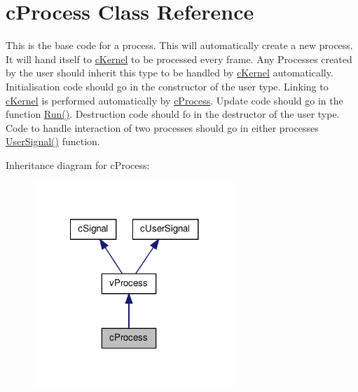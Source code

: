 \hypertarget{classc_process}{
\section{cProcess Class Reference}
\label{classc_process}
}


This is the base code for a process. This will automatically create a new process. It will hand itself to \hyperlink{classc_kernel}{cKernel} to be processed every frame. Any Processes created by the user should inherit this type to be handled by \hyperlink{classc_kernel}{cKernel} automatically. Initialisation code should go in the constructor of the user type. Linking to \hyperlink{classc_kernel}{cKernel} is performed automatically by \hyperlink{classc_process}{cProcess}. Update code should go in the function \hyperlink{classc_process_a3e0fab4ccc0a8fb065d50eb88b6a0dd5}{Run()}. Destruction code should fo in the destructor of the user type. Code to handle interaction of two processes should go in either processes \hyperlink{classc_process_ac436ca09957adbf1c9cdea5ea0af9e9a}{UserSignal()} function.  




Inheritance diagram for cProcess:
\nopagebreak
\begin{figure}[H]
\begin{center}
\leavevmode
\includegraphics[width=216pt]{classc_process__inherit__graph}
\end{center}
\end{figure}


